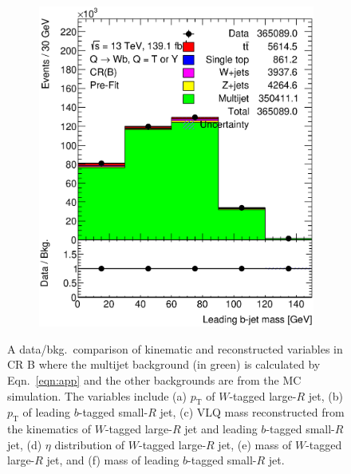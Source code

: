 \begin{figure}[hbt!]
\begin{subfigure}{.35\textwidth}
		\caption{}
		\label{fig:app:cr_b:ljet_m}
	\end{subfigure}\hspace{0.6cm}
	\begin{subfigure}{.35\textwidth}
		\centering
		\includegraphics[width=\linewidth,height=\textheight,keepaspectratio]{CR_B_jet_m.eps}
		\caption{}
		\label{fig:app:cr_b:jet_m}
	\end{subfigure}
	\caption{A data/bkg.\ comparison of kinematic and reconstructed variables in CR B where the multijet background (in green) is calculated by Eqn.\ \ref{eqn:app} and the other backgrounds are from the MC simulation. The variables include (a) $p_{\text{T}}$ of $W$-tagged large-$R$ jet, (b) $p_{\text{T}}$ of leading $b$-tagged small-$R$ jet, (c) VLQ mass reconstructed from the kinematics of $W$-tagged large-$R$ jet and leading $b$-tagged small-$R$ jet, (d) $\eta$ distribution of $W$-tagged large-$R$ jet, (e) mass of $W$-tagged large-$R$ jet, and (f) mass of leading $b$-tagged small-$R$ jet.}
	\label{fig:app:cr_b}
\end{figure}







